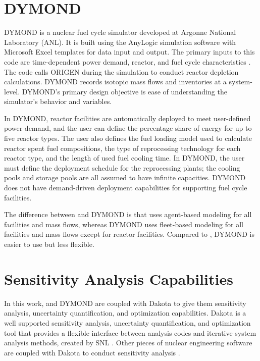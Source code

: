 \section{DYMOND}
DYMOND \cite{yacout_modeling_2005} is a nuclear fuel cycle simulator developed 
at Argonne National Laboratory (\gls{ANL}). 
It is built using the AnyLogic simulation software with 
Microsoft Excel templates for data input and output. 
The primary inputs to this code are time-dependent power demand, 
reactor, and fuel cycle characteristics 
\cite{feng_standardized_2016}.   
The code calls ORIGEN \cite{bell_origen_1973} during the simulation 
to conduct reactor depletion calculations. 
DYMOND records isotopic mass flows and inventories
at a system-level.
DYMOND's primary design objective is ease of understanding the  
simulator's behavior and variables. 

In DYMOND, reactor facilities are automatically deployed to 
meet user-defined power demand, and the user can define 
the percentage share of energy for up to five reactor types. 
The user also defines the fuel loading model used to calculate 
reactor spent fuel compositions, the type of reprocessing 
technology for each reactor type, and the length 
of used fuel cooling time. 
In DYMOND, the user must define the deployment schedule for 
the reprocessing plants; the cooling pools and storage pools 
are all assumed to have infinite capacities. 
DYMOND does not have demand-driven deployment capabilities for 
supporting fuel cycle facilities. 

The difference between \Cyclus and DYMOND is that \Cyclus uses 
agent-based modeling for all facilities and mass flows, 
whereas DYMOND uses fleet-based modeling for all facilities and 
mass flows except for reactor facilities. 
Compared to \Cyclus, DYMOND is easier to use but less flexible. 

\section{Sensitivity Analysis Capabilities}
In this work, \Cyclus and DYMOND are coupled with Dakota 
\cite{eldred_dakota_2010} to give them
sensitivity analysis, 
uncertainty quantification, and optimization capabilities. 
Dakota is a well supported sensitivity analysis, uncertainty quantification, 
and optimization tool that provides a flexible interface between 
analysis codes and iterative system analysis methods, created by \gls{SNL} 
\cite{turner_virtual_nodate}. 
Other pieces of nuclear engineering software are coupled with 
Dakota to conduct sensitivity analysis
\cite{turner_virtual_nodate,zhang_uncertainty_nodate}. 

